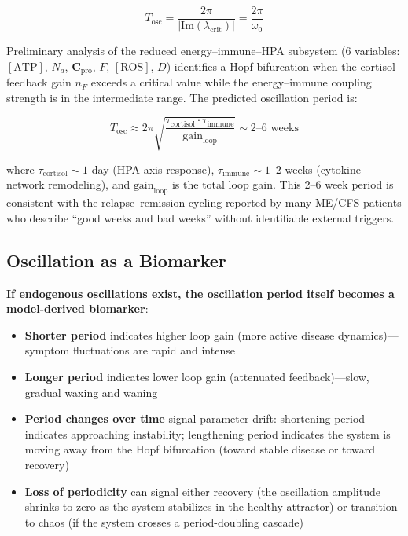 \begin{equation}
\label{eq:oscillation-period}
T_{\text{osc}} = \frac{2\pi}{|\text{Im}(\lambda_{\text{crit}})|} = \frac{2\pi}{\omega_0}
\end{equation}

Preliminary analysis of the reduced energy--immune--HPA subsystem (6 variables: $[\text{ATP}]$, $N_a$, $\boldsymbol{C}_{\text{pro}}$, $F$, $[\text{ROS}]$, $D$) identifies a Hopf bifurcation when the cortisol feedback gain $n_F$ exceeds a critical value while the energy--immune coupling strength is in the intermediate range. The predicted oscillation period is:

\begin{equation}
\label{eq:predicted-period}
T_{\text{osc}} \approx 2\pi \sqrt{\frac{\tau_{\text{cortisol}} \cdot \tau_{\text{immune}}}{\text{gain}_{\text{loop}}}} \sim 2\text{--}6 \text{ weeks}
\end{equation}

where $\tau_{\text{cortisol}} \sim 1$ day (HPA axis response), $\tau_{\text{immune}} \sim 1$--$2$ weeks (cytokine network remodeling), and $\text{gain}_{\text{loop}}$ is the total loop gain. This 2--6 week period is consistent with the relapse--remission cycling reported by many ME/CFS patients who describe ``good weeks and bad weeks'' without identifiable external triggers.

\subsection{Oscillation as a Biomarker}

\textbf{If endogenous oscillations exist, the oscillation period itself becomes a model-derived biomarker}:

\begin{itemize}
    \item \textbf{Shorter period} indicates higher loop gain (more active disease dynamics)---symptom fluctuations are rapid and intense
    \item \textbf{Longer period} indicates lower loop gain (attenuated feedback)---slow, gradual waxing and waning
    \item \textbf{Period changes over time} signal parameter drift: shortening period indicates approaching instability; lengthening period indicates the system is moving away from the Hopf bifurcation (toward stable disease or toward recovery)
    \item \textbf{Loss of periodicity} can signal either recovery (the oscillation amplitude shrinks to zero as the system stabilizes in the healthy attractor) or transition to chaos (if the system crosses a period-doubling cascade)
\end{itemize}

